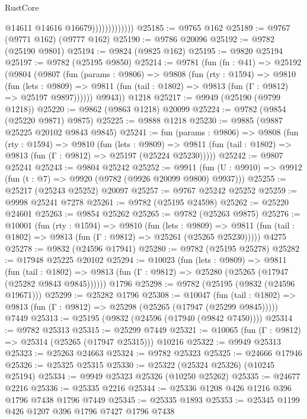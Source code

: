 \begin{lexlean}{RustCore}
\begin{coremodule}
                              @14611
                              @14616
                              @16679)))))))))))))
@25185 := @9765 @162
@25189 := @9767 (@9771 @162) (@9777 @162)
@25190 := @9786 @20096
@25192 := @9782 (@25190 @9801)
@25194 := @9824 (@9825 @162)
@25195 := @9820 @25194
@25197 := @9782 (@25195 @9850)
@25214 := @9781
    (fun (fn : @41) =>
    @25192
      (@9804
        (@9807
          (fun (params : @9806) =>
          @9808
            (fun (rty : @1594) =>
            @9810
              (fun (lets : @9809) =>
              @9811 (fun (tail : @1802) => @9813 (fun (Γ : @9812) => @25197 @9897))))))
        @9943))
    @1218
@25217 := @9949 (@25190 (@9799 @1218))
@25220 := @9862 (@9863 @1218) @20099
@25224 := @9782 (@9854 (@25220 @9871) @9875)
@25225 := @9888 @1218
@25230 := @9885 (@9887 @25225 @20102 @9843 @9845)
@25241 := fun (params : @9806) =>
  @9808
    (fun (rty : @1594) =>
    @9810
      (fun (lets : @9809) =>
      @9811 (fun (tail : @1802) => @9813 (fun (Γ : @9812) => @25197 (@25224 @25230)))))
@25242 := @9807 @25241
@25243 := @9804 @25242
@25252 := @9911
    (fun (U : @9910) => @9912 (fun (t : @7) => @9920 (@9782 (@9926 @20099 @9800) @9937)))
@25255 := @25217 (@25243 @25252) @20097
@25257 := @9767 @25242 @25252
@25259 := @9998 @25241 @7278
@25261 := @9782 (@25195 @24598)
@25262 := @25220 @24601
@25263 := @9854 @25262
@25265 := @9782 (@25263 @9875)
@25276 := @10001
    (fun (rty : @1594) =>
    @9810
      (fun (lets : @9809) =>
      @9811 (fun (tail : @1802) => @9813 (fun (Γ : @9812) => @25261 (@25265 @25230)))))
    @4275
@25278 := @9832 (@24596 @17941)
@25280 := @9782 (@25195 @25278)
@25282 := @17948 @25225 @20102
@25294 := @10023
    (fun (lets : @9809) =>
    @9811
      (fun (tail : @1802) =>
      @9813 (fun (Γ : @9812) => @25280 (@25265 (@17947 (@25282 @9843 @9845))))))
    @1796
@25298 := @9782 (@25195 (@9832 (@24596 @19671)))
@25299 := @25282 @1796
@25308 := @10047
    (fun (tail : @1802) => @9813 (fun (Γ : @9812) => @25298 (@25265 (@17947 (@25299 @9845)))))
    @7449
@25313 := @25195 (@9832 (@24596 (@17940 (@9842 @7450))))
@25314 := @9782 @25313
@25315 := @25299 @7449
@25321 := @10065 (fun (Γ : @9812) => @25314 (@25265 (@17947 @25315))) @10216
@25322 := @9949 @25313
@25323 := @25263 @24663
@25324 := @9782 @25323
@25325 := @24666 @17946
@25326 := @25325 @25315
@25330 := @25322 (@25324 @25326) (@10245 @25194)
@25334 := @9949 @25323 @25326 (@10250 @25262)
@25335 := @24677 @2216
@25336 := @25335 @2216
@25344 := @25336 @1208 @426 @1216 @396 @1796 @7438 @1796 @7449
@25345 := @25335 @1893
@25353 := @25345 @1199 @426 @1207 @396 @1796 @7427 @1796 @7438

\end{coremodule}
\end{lexlean}
